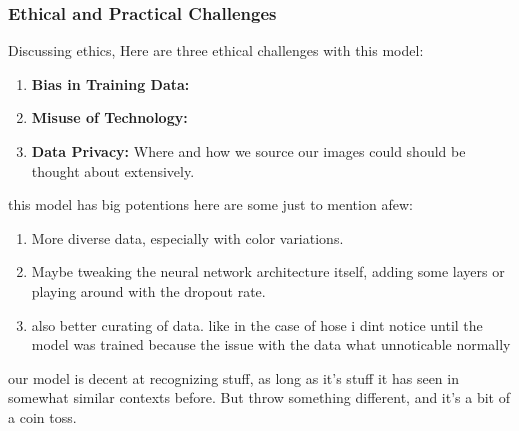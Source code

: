 \subsubsection{Ethical and Practical Challenges}
Discussing ethics,
Here are three ethical challenges with this model:
\begin{enumerate}
    \item \textbf{Bias in Training Data:}
    \item \textbf{Misuse of Technology:}
    \item \textbf{Data Privacy:} Where and how we source our images could should be thought about extensively.
\end{enumerate}

this model has big potentions here are some just to mention afew:
\begin{enumerate}
    \item More diverse data, especially with color variations.
    \item Maybe tweaking the neural network architecture itself, adding some layers or playing around with the dropout rate.
    \item also better curating of data. like in the case of hose i dint notice until the model was trained because the issue with the data what unnoticable normally
\end{enumerate}

our model is decent at recognizing stuff, as long as it's stuff it has seen in somewhat similar contexts before. But throw something different, and it’s a bit of a coin toss.
